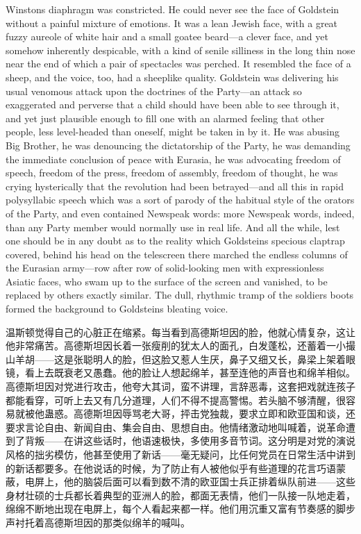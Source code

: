 \begin{paracol}{2}
Winston\textquotesingle s diaphragm was constricted. He could never see
the face of Goldstein without a painful mixture of emotions. It was a
lean Jewish face, with a great fuzzy aureole of white hair and a small
goatee beard---a clever face, and yet somehow inherently despicable,
with a kind of senile silliness in the long thin nose near the end of
which a pair of spectacles was perched. It resembled the face of a
sheep, and the voice, too, had a sheeplike quality. Goldstein was
delivering his usual venomous attack upon the doctrines of the
Party---an attack so exaggerated and perverse that a child should have
been able to see through it, and yet just plausible enough to fill one
with an alarmed feeling that other people, less level-headed than
oneself, might be taken in by it. He was abusing Big Brother, he was
denouncing the dictatorship of the Party, he was demanding the immediate
conclusion of peace with Eurasia, he was advocating freedom of speech,
freedom of the press, freedom of assembly, freedom of thought, he was
crying hysterically that the revolution had been betrayed---and all this
in rapid polysyllabic speech which was a sort of parody of the habitual
style of the orators of the Party, and even contained Newspeak words:
more Newspeak words, indeed, than any Party member would normally use in
real life. And all the while, lest one should be in any doubt as to the
reality which Goldstein\textquotesingle s specious claptrap covered,
behind his head on the telescreen there marched the endless columns of
the Eurasian army---row after row of solid-looking men with
expressionless Asiatic faces, who swam up to the surface of the screen
and vanished, to be replaced by others exactly similar. The dull,
rhythmic tramp of the soldiers\textquotesingle{} boots formed the
background to Goldstein\textquotesingle s bleating voice.

\switchcolumn

温斯顿觉得自己的心脏正在缩紧。每当看到高德斯坦因的脸，他就心情复杂，这让他非常痛苦。高德斯坦因长着一张瘦削的犹太人的面孔，白发蓬松，还蓄着一小撮山羊胡——这是张聪明人的脸，但这脸又惹人生厌，鼻子又细又长，鼻梁上架着眼镜，看上去既衰老又愚蠢。他的脸让人想起绵羊，甚至连他的声音也和绵羊相似。高德斯坦因对党进行攻击，他夸大其词，蛮不讲理，言辞恶毒，这套把戏就连孩子都能看穿，可听上去又有几分道理，人们不得不提高警惕。若头脑不够清醒，很容易就被他蛊惑。高德斯坦因辱骂老大哥，抨击党独裁，要求立即和欧亚国和谈，还要求言论自由、新闻自由、集会自由、思想自由。他情绪激动地叫喊着，说革命遭到了背叛——在讲这些话时，他语速极快，多使用多音节词。这分明是对党的演说风格的拙劣模仿，他甚至使用了新话——毫无疑问，比任何党员在日常生活中讲到的新话都要多。在他说话的时候，为了防止有人被他似乎有些道理的花言巧语蒙蔽，电屏上，他的脑袋后面可以看到数不清的欧亚国士兵正排着纵队前进——这些身材壮硕的士兵都长着典型的亚洲人的脸，都面无表情，他们一队接一队地走着，绵绵不断地出现在电屏上，每个人看起来都一样。他们用沉重又富有节奏感的脚步声衬托着高德斯坦因的那类似绵羊的喊叫。


\end{paracol}
